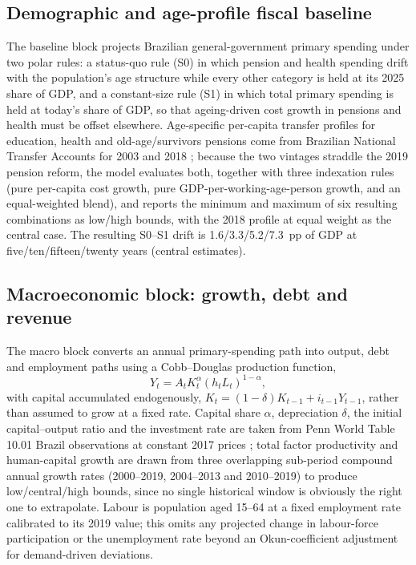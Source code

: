 \documentclass[11pt,a4paper]{article}
\begin{document}
\subsection{Demographic and age-profile fiscal baseline}

The baseline block projects Brazilian general-government primary spending under two polar rules: a status-quo rule (\textsc{S0}) in which pension and health spending drift with the population's age structure while every other category is held at its 2025 share of GDP, and a constant-size rule (\textsc{S1}) in which total primary spending is held at today's share of GDP, so that ageing-driven cost growth in pensions and health must be offset elsewhere. Age-specific per-capita transfer profiles for education, health and old-age/survivors pensions come from Brazilian National Transfer Accounts for 2003 and 2018 \citep{nta2018}; because the two vintages straddle the 2019 pension reform, the model evaluates both, together with three indexation rules (pure per-capita cost growth, pure GDP-per-working-age-person growth, and an equal-weighted blend), and reports the minimum and maximum of six resulting combinations as low/high bounds, with the 2018 profile at equal weight as the central case. The resulting \textsc{S0}--\textsc{S1} drift is 1.6/3.3/5.2/7.3~pp of GDP at five/ten/fifteen/twenty years (central estimates).

\subsection{Macroeconomic block: growth, debt and revenue}

The macro block converts an annual primary-spending path into output, debt and employment paths using a Cobb--Douglas production function,
\begin{equation}
Y_t = A_t K_t^{\alpha} (h_t L_t)^{1-\alpha},
\end{equation}
with capital accumulated endogenously, $K_t = (1-\delta)K_{t-1} + i_{t-1}Y_{t-1}$, rather than assumed to grow at a fixed rate. Capital share $\alpha$, depreciation $\delta$, the initial capital--output ratio and the investment rate are taken from Penn World Table 10.01 Brazil observations at constant 2017 prices \citep{pwt1001}; total factor productivity and human-capital growth are drawn from three overlapping sub-period compound annual growth rates (2000--2019, 2004--2013 and 2010--2019) to produce low/central/high bounds, since no single historical window is obviously the right one to extrapolate. Labour is population aged 15--64 at a fixed employment rate calibrated to its 2019 value; this omits any projected change in labour-force participation or the unemployment rate beyond an Okun-coefficient adjustment for demand-driven deviations.
\end{document}
